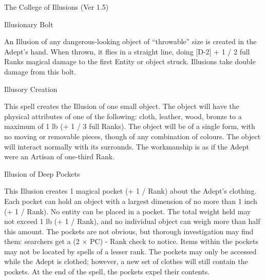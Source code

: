 \begin{Chapter}{The College of Illusions (Ver 1.5)}
\begin{spell}[S-2]{Illusionary Bolt}

\begin{effects}
An Illusion of any dangerous-looking object of “throwable” size is
created in the Adept’s hand. When thrown, it flies in a straight line,
doing [D-2] + 1 / 2 full Ranks magical damage to the first Entity or
object struck.  Illusions take double damage from this bolt.
\end{effects}
\end{spell}

\begin{spell}[S-3]{Illusory Creation}

\begin{effects}
This spell creates the Illusion of one small object. The object will
have the physical attributes of one of the following: cloth, leather,
wood, bronze to a maximum of 1 lb (+ 1 / 3 full Ranks).  The object
will be of a single form, with no moving or removable pieces, though
of any combination of colours.  The object will interact normally with
its surrounds.  The workmanship is as if the Adept were an Artisan of
one-third Rank.
\end{effects}
\end{spell}

\begin{spell}[S-4]{Illusion of Deep Pockets}

\begin{effects}
This Illusion creates 1 magical pocket (+ 1 / Rank) about the Adept’s
clothing.  Each pocket can hold an object with a largest dimension of
no more than 1 inch (+ 1 / Rank).  No entity can be placed in a
pocket.  The total weight held may not exceed 1 lb (+ 1 / Rank), and
no individual object can weigh more than half this amount. The pockets
are not obvious, but thorough investigation may find them: searchers
get a (2 × PC) - Rank check to notice. Items within the pockets may
not be located by spells of a lesser rank. The pockets may only be
accessed while the Adept is clothed; however, a new set of clothes
will still contain the pockets. At the end of the spell, the pockets
expel their contents.
\end{effects}
\end{spell}


\end{Chapter}
